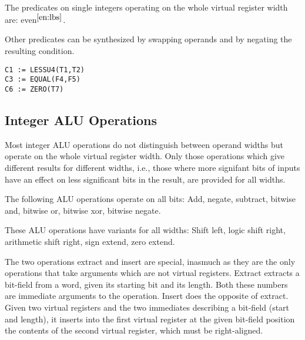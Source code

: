 \documentclass{article}
\newcommand{\enoteref}[1]{$^{\ref{#1}}$}
\begin{document}
The predicates on single integers operating on the whole virtual
register width are: even\enoteref{en:lbs}.

Other predicates can be synthesized by swapping operands and by
negating the resulting condition.

\begin{verbatim}
C1 := LESSU4(T1,T2)
C3 := EQUAL(F4,F5)
C6 := ZERO(T7)
\end{verbatim}

\subsection{Integer ALU Operations}

Most integer ALU operations do not distinguish between operand widths
but operate on the whole virtual register width.  Only those
operations which give different results for different widths, i.e.,
those where more signifant bits of inputs have an effect on less
significant bits in the result, are provided for all widths.

The following ALU operations operate on all bits: Add, negate,
subtract, bitwise and, bitwise or, bitwise xor, bitwise negate.

These ALU operations have variants for all widths: Shift
left, logic shift right,
arithmetic shift right, sign extend, zero extend.


The two operations extract and insert are special, inasmuch as they
are the only operations that take arguments which are not virtual
registers.  Extract extracts a bit-field from a word, given its
starting bit and its length.  Both these numbers are immediate
arguments to the operation.
Insert does the opposite of extract.  Given two virtual registers and
the two immediates describing a bit-field (start and length), it
inserts into the first virtual register at the given bit-field
position the contents of the second virtual register, which must be
right-aligned.
\end{document}
